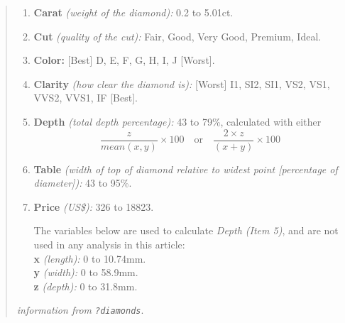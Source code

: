 \documentclass[
]{article}
\begin{document}
\begin{quote}
\begin{enumerate}
\def\labelenumi{\arabic{enumi}.}
\item
  \textbf{Carat} \emph{(weight of the diamond):} 0.2 to 5.01ct.
\item
  \textbf{Cut} \emph{(quality of the cut):} Fair, Good, Very Good,
  Premium, Ideal.
\item
  \textbf{Color:} {[}Best{]} D, E, F, G, H, I, J {[}Worst{]}.
\item
  \textbf{Clarity} \emph{(how clear the diamond is):} {[}Worst{]} I1,
  SI2, SI1, VS2, VS1, VVS2, VVS1, IF {[}Best{]}.
\item
  \textbf{Depth} \emph{(total depth percentage):} 43 to 79\%, calculated
  with either
  \[\frac{z}{mean(x, y)}\times 100 \quad \text{or}\quad \frac{2
  \times z}{(x + y)}\times 100\]
\item
  \textbf{Table} \emph{(width of top of diamond relative to widest point
  {[}percentage of diameter{]}):} 43 to 95\%.
\item
  \textbf{Price} \emph{(US\$):} 326 to 18823.

  The variables below are used to calculate \emph{Depth (Item 5)}, and
  are not used in any analysis in this article:\\
  \textbf{x} \emph{(length):} 0 to 10.74mm.\\
  \textbf{y} \emph{(width):} 0 to 58.9mm.\\
  \textbf{z} \emph{(depth):} 0 to 31.8mm.
\end{enumerate}

\emph{information from \texttt{?diamonds}}.
\end{quote}
\end{document}
